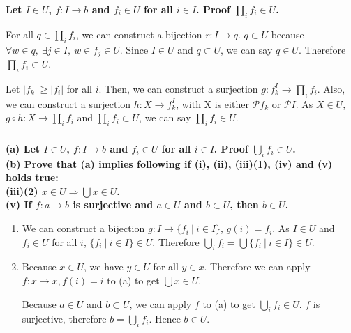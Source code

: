 \documentclass{article}
\begin{document}
\subsubsection{}

\textbf{Let $I \in U$, $f : I \rightarrow b $ and $f_i \in U$ for all $i \in I$. Proof $\prod_i f_i \in U$.}

For all $q \in \prod_i f_i$, we can construct a bijection $r : I \rightarrow q$. $q \subset U$ because $\forall w \in q,\ \exists j \in I,\ w \in f_j \in U$. Since $I \in U$ and $q \subset U$, we can say $q \in U$. Therefore $\prod_i f_i \subset U$.

Let $|f_k| \geq |f_i|$ for all $i$. Then, we can construct a surjection $g : f_k^I \rightarrow \prod_i f_i$. Also, we can construct a surjection $h : X \rightarrow f_k^I$, with X is either $\mathcal{P} f_k$ or $\mathcal{P} I$. As $X \in U$, $g \circ h : X \rightarrow \prod_i f_i$ and $\prod_i f_i \subset U$, we can say $\prod_i f_i \in U$.

\subsubsection{}

\textbf{(a) Let $I \in U$, $f : I \rightarrow b $ and $f_i \in U$ for all $i \in I$. Proof $\bigcup_i f_i \in U$. \\ (b) Prove that (a) implies following if (i), (ii), (iii)(1), (iv) and (v) holds true: \\ \indent (iii)(2) $x \in U \Rightarrow \bigcup x \in U$. \\ \indent (v) If $f : a \rightarrow b$ is surjective and $a \in U$ and $b \subset U$, then $b \in U$.
}

\begin{enumerate}[label=(\alph*)]
\item We can construct a bijection $g :  I \rightarrow \{f_i\ |\ i \in I\}$, $g(i) = f_i$. As $I \in U$ and $f_i \in U$ for all $i$, $\{f_i\ |\ i \in I\} \in U$. Therefore $ \bigcup_i f_i = \bigcup \{f_i\ |\ i \in I\} \in U$.
\item Because $x \in U$, we have $y \in U$ for all $y \in x$. Therefore we can apply $f : x \rightarrow x, f(i) = i$ to (a) to get $\bigcup x \in U$.

Because $a \in U$ and $b \subset U$, we can apply $f$ to (a) to get $\bigcup_i f_i \in U$. $f$ is surjective, therefore $b = \bigcup_i f_i$. Hence $b \in U$.
\end{enumerate}
\end{document}
